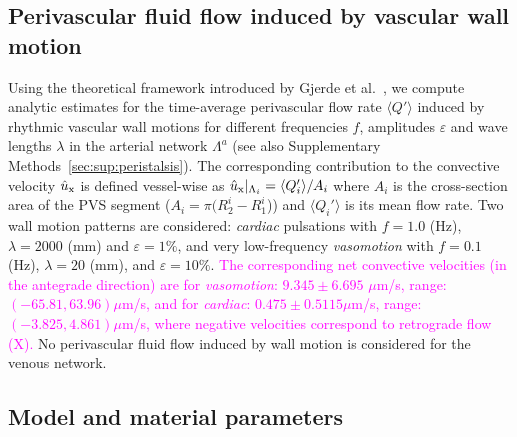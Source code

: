 \documentclass[fleqn,10pt]{wlscirep}
\newcommand{\mer}[1]{\textcolor{magenta}{#1}}
\begin{document}


\subsection*{Perivascular fluid flow induced by vascular wall motion}

Using the theoretical framework introduced by Gjerde et
al.~\cite{gjerde2023directional}, we compute analytic estimates for
the time-average perivascular flow rate $\langle Q' \rangle$ induced
by rhythmic vascular wall motions for different frequencies $f$,
amplitudes $\varepsilon$ and wave lengths $\lambda$ in the arterial
network $\Lambda^a$ (see also Supplementary
Methods~\ref{sec:sup:peristalsis}). The corresponding contribution to
the convective velocity $\hat{u}_{\rm x}$ is defined vessel-wise as
$\hat{u}_{\rm x}|_{\Lambda_i} = \langle Q'_i \rangle/A_i$ where $A_i$
is the cross-section area of the PVS segment ($A_i = \pi (R_2^i -
R_1^i$)) and $\langle Q_i' \rangle$ is its mean flow rate. Two wall
motion patterns are considered: \emph{cardiac} pulsations with $f =
1.0$ (Hz), $\lambda = 2000$ (mm) and $\varepsilon = 1\%$, and very
low-frequency \emph{vasomotion} with $f = 0.1$ (Hz), $\lambda = 20$
(mm), and $\varepsilon = 10\%$. \mer{The corresponding net convective
velocities (in the antegrade direction) are for \emph{vasomotion}:
$9.345 \pm 6.695$ $\mu$m/s, range: $(-65.81, 63.96) \mu$m/s, and for
\emph{cardiac}: $0.475 \pm 0.5115 \mu$m/s, range: $(- 3.825, 4.861)
\mu$m/s, where negative velocities correspond to retrograde flow
(\Cref{fig:pvs}\mer{X}).} No perivascular fluid flow induced by wall
motion is considered for the venous network.


\subsection*{Model and material parameters}
\end{document}
